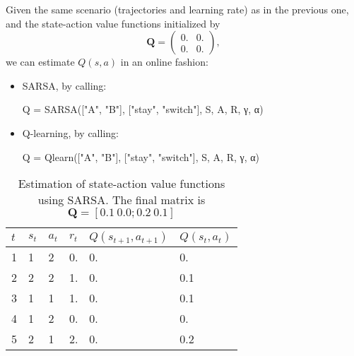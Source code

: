 \documentclass[12pt]{article}
\begin{document}
Given the same scenario (trajectories and learning rate) as in the previous one, and the state-action value functions initialized by
\begin{equation*}
    \mathbf{Q} = 
    \begin{pmatrix}
        0. & 0. \\
        0. & 0.
    \end{pmatrix},
\end{equation*}
we can estimate $Q(s,a)$ in an online fashion:
\begin{itemize}
    \item SARSA, by calling:
    \begin{jllisting}
        Q = SARSA(["A", "B"], ["stay", "switch"], S, A, R, γ, α)
    \end{jllisting}
    \item Q-learning, by calling:
    \begin{jllisting}
        Q = Qlearn(["A", "B"], ["stay", "switch"], S, A, R, γ, α)
    \end{jllisting}
\end{itemize}
\begin{table}[H]
    \centering
    \caption{Estimation of state-action value functions using SARSA. The final matrix is $\mathbf{Q} = [0.1~0.0; 0.2~0.1]$}
    \label{tab:SARSA}
    \begin{tabular}{|l|l|l|l|l|l|}
    \hline
    $t$ & $s_{t}$ & $a_t$ & $r_{t}$ & $Q(s_{t+1}, a_{t+1})$ & $Q(s_t, a_t)$ \\ \hline
    1   & 1       & 2     & 0.      & 0.                    & 0.            \\ \hline
    2   & 2       & 2     & 1.      & 0.                    & 0.1           \\ \hline
    3   & 1       & 1     & 1.      & 0.                    & 0.1           \\ \hline
    4   & 1       & 2     & 0.      & 0.                    & 0.            \\ \hline
    5   & 2       & 1     & 2.      & 0.                    & 0.2           \\ \hline
    \end{tabular}
\end{table}
\end{document}
